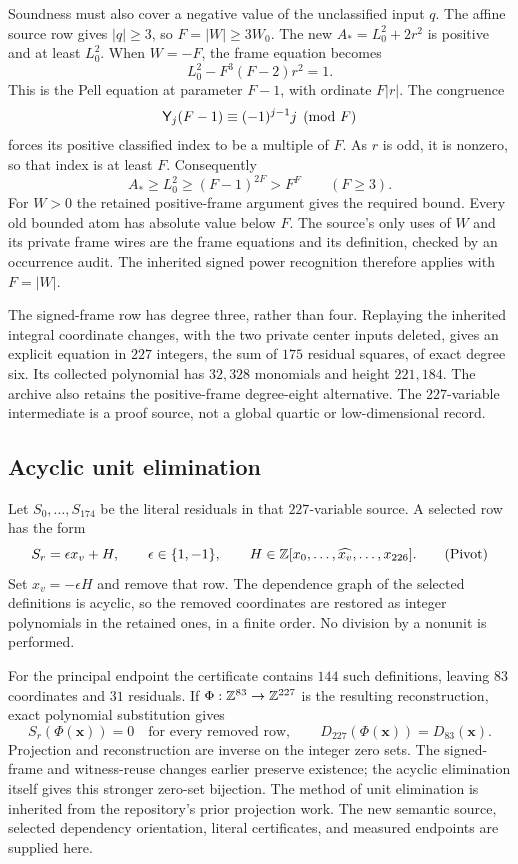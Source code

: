 Soundness must also cover a negative value of the unclassified input \(q\).
The affine source row gives \(|q|\ge3\), so \(F=|W|\ge3W_0\).
The new \(A_*=L_0^2+2r^2\) is positive and at least \(L_0^2\).
When \(W=-F\), the frame equation becomes
\[
 L_0^2-F^3(F-2)r^2=1.
\]
This is the Pell equation at parameter \(F-1\), with ordinate \(F|r|\).
The congruence
\[
 \mathsf Y_j(F-1)\equiv(-1)^{j-1}j\pmod F
\]
forces its positive classified index to be a multiple of \(F\).
As \(r\) is odd, it is nonzero, so that index is at least \(F\).
Consequently
\[
 A_*\ge L_0^2\ge(F-1)^{2F}>F^F\qquad(F\ge3).
\]
For \(W>0\) the retained positive-frame argument gives the required
bound. Every old bounded atom has absolute value below \(F\).
The source's only uses of \(W\) and its private frame wires are the frame
equations and its definition, checked by an occurrence audit.
The inherited signed power recognition therefore applies with \(F=|W|\).

The signed-frame row has degree three, rather than four.
Replaying the inherited integral coordinate changes, with the two private
center inputs deleted, gives an explicit equation in \(227\) integers,
the sum of \(175\) residual squares, of exact degree six.
Its collected polynomial has \(32{,}328\) monomials and height \(221{,}184\).
The archive also retains the positive-frame degree-eight alternative.
The \(227\)-variable intermediate is a proof source, not a global quartic
or low-dimensional record.

\subsection{Acyclic unit elimination}

Let \(S_0,\ldots,S_{174}\) be the literal residuals in that \(227\)-variable
source. A selected row has the form
\[
 S_r=\epsilon x_v+H,\qquad \epsilon\in\{1,-1\},
 \qquad H\in\mathbb Z[x_0,\ldots,\widehat{x_v},\ldots,x_{226}].
 \tag{Pivot}
\]
Set \(x_v=-\epsilon H\) and remove that row.
The dependence graph of the selected definitions is acyclic, so the
removed coordinates are restored as integer polynomials in the retained
ones, in a finite order. No division by a nonunit is performed.

For the principal endpoint the certificate contains \(144\) such
definitions, leaving \(83\) coordinates and \(31\) residuals.
If \(\Phi:\mathbb Z^{83}\to\mathbb Z^{227}\) is the resulting reconstruction, exact
polynomial substitution gives
\[
 S_r(\Phi(\boldsymbol x))=0
 \quad\text{for every removed row},\qquad
 D_{227}(\Phi(\boldsymbol x))=D_{83}(\boldsymbol x).
 \tag{Restore}
\]
Projection and reconstruction are inverse on the integer zero sets.
The signed-frame and witness-reuse changes earlier preserve existence;
the acyclic elimination itself gives this stronger zero-set bijection.
The method of unit elimination is inherited from the repository's prior
projection work. The new semantic source, selected dependency orientation,
literal certificates, and measured endpoints are supplied here.

